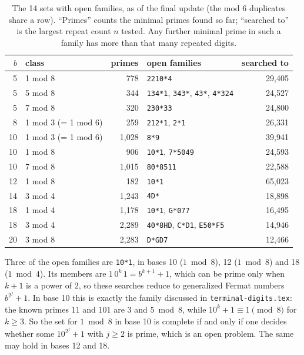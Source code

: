 \documentclass[11pt]{article}
\newcommand{\code}[1]{\texttt{#1}}
\begin{document}
\begin{table}[h]
\centering\small
\begin{tabular}{@{}rlrp{6.3cm}r@{}}
\toprule
$b$ & class & primes & open families & searched to\\
\midrule
5 & 1 mod 8 & 778 & \code{2210*4} & 29{,}405\\
5 & 5 mod 8 & 344 & \code{134*1}, \code{343*}, \code{43*}, \code{4*324} & 24{,}527\\
5 & 7 mod 8 & 320 & \code{230*33} & 24{,}800\\
8 & 1 mod 3 (= 1 mod 6) & 259 & \code{212*1}, \code{2*1} & 26{,}331\\
10 & 1 mod 3 (= 1 mod 6) & 1{,}028 & \code{8*9} & 39{,}941\\
10 & 1 mod 8 & 906 & \code{10*1}, \code{7*5049} & 24{,}593\\
10 & 7 mod 8 & 1{,}015 & \code{80*8511} & 22{,}588\\
12 & 1 mod 8 & 182 & \code{10*1} & 65{,}023\\
14 & 3 mod 4 & 1{,}243 & \code{4D*} & 18{,}898\\
18 & 1 mod 4 & 1{,}178 & \code{10*1}, \code{G*077} & 16{,}495\\
18 & 3 mod 4 & 2{,}289 & \code{40*8HD}, \code{C*D1}, \code{E50*F5} & 14{,}946\\
20 & 3 mod 8 & 2{,}283 & \code{D*GD7} & 12{,}466\\
\bottomrule
\end{tabular}
\caption{The 14 sets with open families, as of the final update (the mod 6 duplicates share a row). ``Primes'' counts the minimal primes found so far; ``searched to'' is the largest repeat count $n$ tested. Any further minimal prime in such a family has more than that many repeated digits.}
\label{tab:open}
\end{table}

Three of the open families are \code{10*1}, in bases 10 ($1 \bmod 8$), 12 ($1 \bmod 8$) and 18 ($1 \bmod 4$). Its members are $1\,0^k\,1=b^{k+1}+1$, which can be prime only when $k+1$ is a power of $2$, so these searches reduce to generalized Fermat numbers $b^{2^j}+1$. In base 10 this is exactly the family discussed in \code{terminal-digits.tex}: the known primes $11$ and $101$ are $3$ and $5 \bmod 8$, while $10^k+1\equiv 1 \pmod 8$ for $k\ge 3$. So the set for $1 \bmod 8$ in base 10 is complete if and only if one decides whether some $10^{2^j}+1$ with $j\ge 2$ is prime, which is an open problem. The same may hold in bases 12 and 18.
\end{document}
